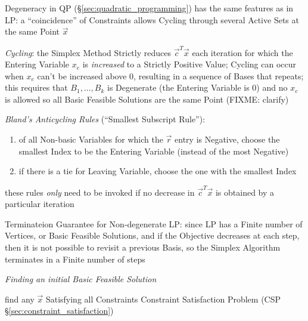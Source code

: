 \fist Degeneracy in QP (\S\ref{sec:quadratic_programming}) has the same
features as in LP: a ``coincidence'' of Constraints allows Cycling through
several Active Sets at the same Point $\vec{x}$

\emph{Cycling}: the Simplex Method Strictly reduces $\vec{c}^T\vec{x}$ each
iteration for which the Entering Variable $x_e$ is \emph{increased} to a
Strictly Positive Value; Cycling can occur when $x_e$ can't be increased above
$0$, resulting in a sequence of Bases that repeats; this requires that $B_1,
\ldots, B_k$ is Degenerate (the Entering Variable is $0$) and no $x_e$ is
allowed so all Basic Feasible Solutions are the same Point
(FIXME: clarify)

\emph{Bland's Anticycling Rules} (``Smallest Subscript Rule''):
\begin{enumerate}
  \item of all Non-basic Variables for which the $\vec{r}$ entry is Negative,
    choose the smallest Index to be the Entering Variable (instead of the most
    Negative)
  \item if there is a tie for Leaving Variable, choose the one with the
    smallest Index
\end{enumerate}
these rules \emph{only} need to be invoked if no decrease in $\vec{c}^T\vec{x}$
is obtained by a particular iteration

Terminateion Guarantee for Non-degenerate LP: since LP has a Finite number of
Vertices, or Basic Feasible Solutions, and if the Objective decreases at each
step, then it is not possible to revisit a previous Basis, so the Simplex
Algorithm terminates in a Finite number of steps


\emph{Finding an initial Basic Feasible Solution}

find any $\vec{x}$ Satisfying all Constraints \fist Constraint Satisfaction
Problem (CSP \S\ref{sec:constraint_satisfaction})

